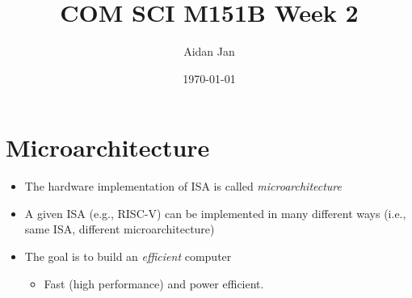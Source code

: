 \documentclass[10pt]{article}
\title{COM SCI M151B Week 2}
\author{Aidan Jan}
\date{\today}
\begin{document}
\section*{Microarchitecture}
\begin{itemize}
    \item The hardware implementation of ISA is called \textit{microarchitecture}
    \item A given ISA (e.g., RISC-V) can be implemented in many different ways (i.e., same ISA, different microarchitecture)
    \item The goal is to build an \textit{efficient} computer
    \begin{itemize}
        \item Fast (high performance) and power efficient.
    \end{itemize}
\end{itemize}
\end{document}
